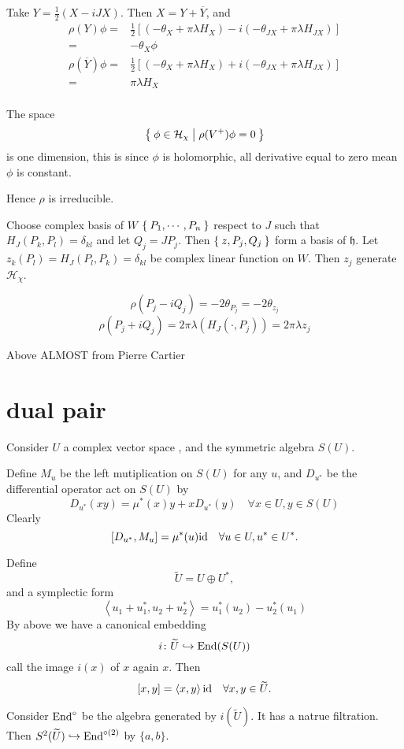 \documentclass[12pt]{article}
\def\End{{\rm End}}
\def\id{{\rm id}}
\def\inn#1#2{\left\langle{#1},{#2}\right\rangle}
\def\fhh{\mathfrak{h}}
\def\chh{\mathcal{H}}
\def\tU{{\widetilde{U}}}
\begin{document}
Take $Y = \frac{1}{2}(X-iJX)$. Then $X = Y + \overline{Y}$, 
and 
\[
\begin{split}
\rho(Y) \phi =& \frac{1}{2}[(-\theta_X + \pi \lambda H_X) 
-i(-\theta_{JX}+\pi\lambda H_{JX})]\\
=& -\theta_X \phi 
\end{split}
\]
\[
\begin{split}
\rho(\overline{Y}) \phi =& \frac{1}{2}[(-\theta_X + \pi \lambda H_X) 
+i(-\theta_{JX}+\pi\lambda H_{JX})]\\
=& \pi\lambda H_X \\
\end{split}
\]

The space 
\[
\Set{\phi \in \chh_\chi |\rho(V^+) \phi = 0}
\]
is one dimension, this is since $\phi$ is holomorphic, 
all derivative equal to zero mean $\phi$ is constant. 

Hence $\rho$ is irreducible. 

Choose complex basis of $W$ $\Set{P_1, \cdots, P_n}$
respect to $J$ such that
$H_J(P_k, P_l) = \delta_{kl}$ and let $Q_j = J P_j$. 
Then $\Set{z, P_j, Q_j}$ form a basis of $\fhh$. 
Let $z_k(P_l) = H_J(P_l, P_k) =\delta_{kl}$ be complex linear function on 
$W$. Then $z_j$ generate $\chh_\chi$. 

\[
\rho(P_j-iQ_j) = -2 \theta_{P_j} =  -2\theta_{z_j}
\]
\[
\rho(P_j+iQ_j) = 2\pi\lambda (H_J(\cdot,P_j)) 
 = 2\pi \lambda z_j
\]

Above ALMOST from Pierre Cartier 


\section{dual pair}

Consider $U$ a complex vector space , and the symmetric algebra $S(U)$.

Define $M_u$ be the left mutiplication on $S(U)$ for any $u$, 
and $D_{u^*}$ be the differential operator act on $S(U)$ by
\[
D_{u^*}(xy) = \mu^*(x) y + xD_{u^*}(y) \quad \forall x\in U, y\in S(U)
\]
Clearly
\[
[D_{u^*}, M_u] = \mu^*(u) \id \quad \forall u\in U, u^*\in U^*.
\]

Define 
\[
\tU = U\oplus U^*, 
\]
and a symplectic form 
\[
\inn{u_1+u_1^*}{u_2+u_2^*} = u_1^*(u_2) - u_2^*(u_1)
\]
By above we have a canonical embedding 
\[
i\colon \tU \hookrightarrow \End(S(U))   
\]
call the image $i(x)$ of $x$ again $x$. 
Then 
\[
[x,y] = \inn{x}{y} \id \quad \forall x,y \in \tU.
\]

Consider 
$\End^\circ$ be the algebra generated by $i(\tU)$. It has a natrue filtration.
Then $S^2(\tU) \hookrightarrow \End^{\circ (2)}$ by $\{a,b\}$.
\end{document}
